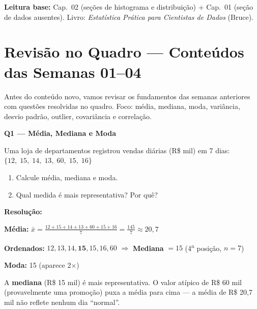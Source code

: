 \begin{NoteBox}
\textbf{Leitura base:} Cap.\ 02 (seções de histograma e distribuição) + Cap.\ 01
(seção de dados ausentes). Livro: \textit{Estatística Prática para Cientistas de Dados} (Bruce).
\end{NoteBox}

\section{Revisão no Quadro — Conteúdos das Semanas 01–04}

\begin{NoteBox}
Antes do conteúdo novo, vamos revisar os fundamentos das semanas
anteriores com questões resolvidas no quadro. Foco: média, mediana,
moda, variância, desvio padrão, outlier, covariância e correlação.
\end{NoteBox}

\begin{SolvedBox}
\textbf{Q1 — Média, Mediana e Moda}

Uma loja de departamentos registrou vendas diárias (R\$ mil) em 7 dias:\\
$\{12,\; 15,\; 14,\; 13,\; 60,\; 15,\; 16\}$

\begin{enumerate}
  \item Calcule média, mediana e moda.
  \item Qual medida é mais representativa? Por quê?
\end{enumerate}

\textbf{Resolução:}

\textbf{Média:} $\bar{x} = \frac{12+15+14+13+60+15+16}{7} = \frac{145}{7} \approx 20{,}7$

\textbf{Ordenados:} $12, 13, 14, \mathbf{15}, 15, 16, 60$ \quad
$\Rightarrow$ \textbf{Mediana} $= 15$ \quad (4\textsuperscript{a} posição, $n=7$)

\textbf{Moda:} 15 (aparece 2$\times$)

A \textbf{mediana} (R\$ 15 mil) é mais representativa. O valor atípico de
R\$ 60 mil (provavelmente uma promoção) puxa a média para cima — a média
de R\$ 20,7 mil não reflete nenhum dia ``normal''.
\end{SolvedBox}

